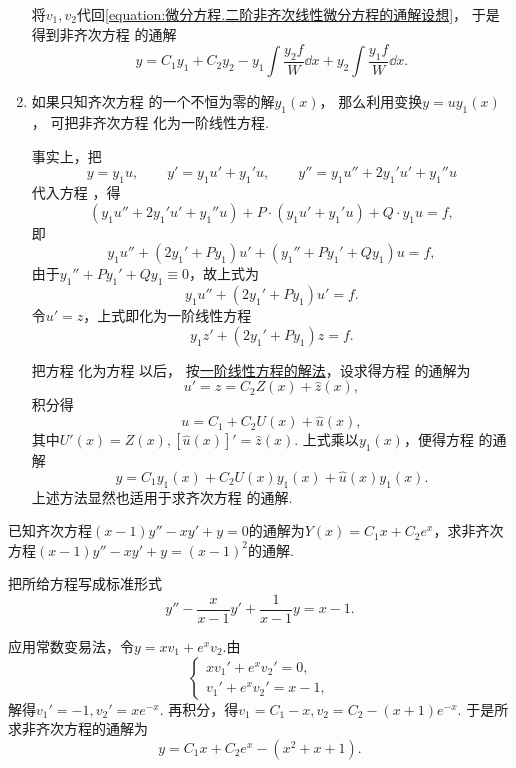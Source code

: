 \begin{enumerate}
将\(v_1,v_2\)代回\cref{equation:微分方程.二阶非齐次线性微分方程的通解设想}，%
于是得到非齐次方程  的通解
\begin{equation}\label{equation:微分方程.二阶非齐次线性微分方程的通解.形式1}
y = C_1 y_1 + C_2 y_2
- y_1 \int \frac{y_2 f}{W} \dd{x}
+ y_2 \int \frac{y_1 f}{W} \dd{x}.
\end{equation}

\item%
如果只知齐次方程  的一个不恒为零的解\(y_1(x)\)，%
那么利用变换\(y = u y_1(x)\)，%
可把非齐次方程  化为一阶线性方程.

事实上，把\[
y = y_1 u, \qquad y' = y_1 u' + y_1' u, \qquad y'' = y_1 u'' + 2 y_1' u' + y_1'' u
\]代入方程 ，得\[
(y_1 u'' + 2y_1' u' + y_1'' u) + P\cdot(y_1 u' + y_1' u) + Q \cdot y_1 u = f,
\]即\[
y_1 u'' + (2y_1' + P y_1) u' + (y_1'' + P y_1' + Q y_1) u = f,
\]由于\(y_1'' + P y_1' + Q y_1 \equiv 0\)，故上式为\[
y_1 u'' + (2 y_1' + P y_1) u' = f.
\]令\(u' = z\)，上式即化为一阶线性方程
\begin{equation}\label{equation:微分方程.降为一阶的二阶线性微分方程}
y_1 z' + (2 y_1' + P y_1) z = f.
\end{equation}

把方程  化为方程  以后，%
按\hyperref[section:微分方程.一阶线性微分方程]{一阶线性方程的解法}，设求得方程  的通解为\[
u' = z = C_2 Z(x) + \hat{z}(x),
\]积分得\[
u = C_1 + C_2 U(x) + \hat{u}(x),
\]其中\(U'(x) = Z(x), [\hat{u}(x)]' = \hat{z}(x)\).
上式乘以\(y_1(x)\)，便得方程  的通解
\begin{equation}\label{equation:微分方程.二阶非齐次线性微分方程的通解.形式2}
y = C_1 y_1(x) + C_2 U(x) y_1(x) + \hat{u}(x) y_1(x).
\end{equation}
上述方法显然也适用于求齐次方程  的通解.
\end{enumerate}

\begin{example}
已知齐次方程\((x-1)y'' - xy' + y = 0\)的通解为\(Y(x) = C_1 x + C_2 e^x\)，求非齐次方程\((x-1)y'' - xy' + y = (x-1)^2\)的通解.
\begin{solution}
把所给方程写成标准形式\[
y'' - \frac{x}{x-1} y' + \frac{1}{x-1} y = x-1.
\]

应用常数变易法，令\(y = x v_1 + e^x v_2\).由\[
\left\{ \begin{array}{l}
x v_1' + e^x v_2' = 0, \\
v_1' + e^x v_2' = x-1,
\end{array} \right.
\]解得\(v_1' = -1, v_2' = x e^{-x}\).
再积分，得\(v_1 = C_1 - x, v_2 = C_2 - (x+1) e^{-x}\).
于是所求非齐次方程的通解为\[
y = C_1 x + C_2 e^x - (x^2+x+1).
\]
\end{solution}
\end{example}

